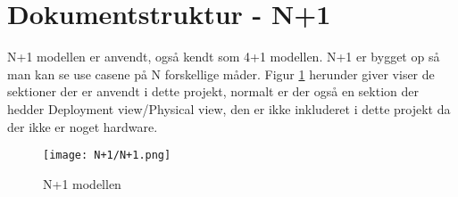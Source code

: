 \section{Dokumentstruktur - N+1}
N+1 modellen er anvendt, også kendt som 4+1 modellen. N+1 er bygget op så man kan se use casene på N forskellige måder. Figur \ref{fig:n+1} herunder giver viser de sektioner der er anvendt i dette projekt, normalt er der også en sektion der hedder Deployment view/Physical view, den er ikke inkluderet i dette projekt da der ikke er noget hardware.   

\begin{figure}[H]
	\centering
	\texttt{[image: N+1/N+1.png]}
	\caption{N+1 modellen}
	\label{fig:n+1}
\end{figure}


